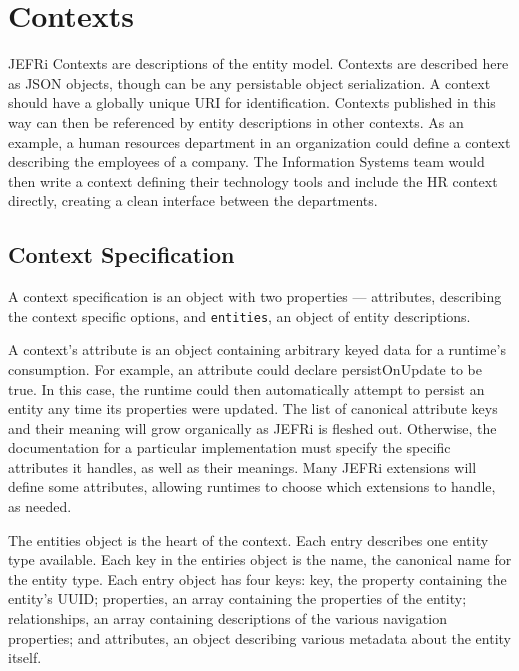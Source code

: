 \documentclass{article}
\renewcommand{\|}{\textbar}
\begin{document}
\section{Contexts}

JEFRi Contexts are descriptions of the entity model. Contexts are described here
as JSON objects, though can be any persistable object serialization.  A context
should have a globally unique URI for identification. Contexts published in this
way can then be referenced by entity descriptions in other contexts. As an
example, a human resources department in an organization could define a context
describing the employees of a company. The Information Systems team would then
write a context defining their technology tools and include the HR context
directly, creating a clean interface between the departments.

\subsection{Context Specification}

A context specification is an object with two properties --- {\ilcode
attributes}, describing the context specific options, and {\tt entities}, an
object of entity descriptions.

A context's {\ilcode attribute} is an object containing arbitrary keyed data for
a runtime's consumption. For example, an {\ilcode attribute} could declare
{\ilcode persistOnUpdate} to be true. In this case, the runtime could then
automatically attempt to persist an entity any time its properties were updated.
The list of canonical {\ilcode attribute} keys and their meaning will grow
organically as JEFRi is fleshed out. Otherwise, the documentation for a
particular implementation must specify the specific attributes it handles, as
well as their meanings. Many JEFRi extensions will define some attributes,
allowing runtimes to choose which extensions to handle, as needed.

The {\ilcode entities} object is the heart of the context. Each entry describes
one entity type available. Each key in the {\ilcode entiries} object is the
{\ilcode name}, the canonical name for the entity type. Each entry object has
four keys: {\ilcode key}, the property containing the entity's UUID; {\ilcode
properties}, an array containing the properties of the entity; {\ilcode
relationships}, an array containing descriptions of the various navigation
properties; and {\ilcode attributes}, an object describing various metadata
about the entity itself.
\end{document}
